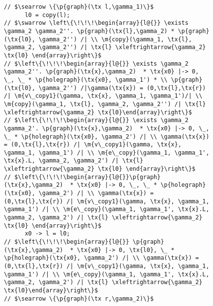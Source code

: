 \begin{figure}
\begin{lstlisting}
// $\searrow \{\p{graph}(\tx l,\gamma_1)\}$
      l0 = copy(l);
// $\swarrow \left\{\!\!\!\begin{array}{l@{}} \exists \gamma_2 \gamma_2''. \p{graph}(\tx{l},\gamma_2) * \p{graph}(\tx{l0}, \gamma_2'') /| \\ \m{copy}(\gamma_1, \tx{l}, \gamma_2, \gamma_2'') /| \tx{l} \xleftrightarrow{\gamma_2} \tx{l0} \end{array}\right\}$
// $\left\{\!\!\!\begin{array}{l@{}} \exists \gamma_2 \gamma_2''. \p{graph}(\tx{x},\gamma_2)  * \tx{x0} |-> 0, \_, \_ * \p{holegraph}(\tx{x0}, \gamma_1') * \\ \p{graph}(\tx{l0}, \gamma_2'') /|\gamma(\tx{x}) = (0,\tx{l},\tx{r}) /| \m{v\_copy1}(\gamma, \tx{x}, \gamma_1, \gamma_1')/| \\ \m{copy}(\gamma_1, \tx{l}, \gamma_2, \gamma_2'') /| \tx{l} \xleftrightarrow{\gamma_2} \tx{l0}\end{array}\right\}$
// $\left\{\!\!\!\begin{array}{l@{}} \exists \gamma_2 \gamma_2'. \p{graph}(\tx{x},\gamma_2)  * \tx{x0} |-> 0, \_, \_ * \p{holegraph}(\tx{x0}, \gamma_2') /| \\ \gamma(\tx{x}) = (0,\tx{l},\tx{r}) /| \m{v\_copy1}(\gamma, \tx{x}, \gamma_1, \gamma_1') /| \\ \m{e\_copy}(\gamma_1, \gamma_1', \tx{x}.L, \gamma_2, \gamma_2') /| \tx{l} \xleftrightarrow{\gamma_2} \tx{l0} \end{array}\right\}$
// $\left\{\!\!\!\begin{array}{l@{}}\p{graph}(\tx{x},\gamma_2)  * \tx{x0} |-> 0, \_, \_ * \p{holegraph}(\tx{x0}, \gamma_2') /| \\ \gamma(\tx{x}) = (0,\tx{l},\tx{r}) /| \m{v\_copy1}(\gamma, \tx{x}, \gamma_1, \gamma_1') /| \\ \m{e\_copy}(\gamma_1, \gamma_1', \tx{x}.L, \gamma_2, \gamma_2') /| \tx{l} \xleftrightarrow{\gamma_2} \tx{l0} \end{array}\right\}$
      x0 -> l = l0;
// $\left\{\!\!\!\begin{array}{l@{}} \p{graph}(\tx{x},\gamma_2)  * \tx{x0} |-> 0, \tx{l0}, \_ * \p{holegraph}(\tx{x0}, \gamma_2') /| \\ \gamma(\tx{x}) = (0,\tx{l},\tx{r}) /| \m{v\_copy1}(\gamma, \tx{x}, \gamma_1, \gamma_1') /| \\ \m{e\_copy}(\gamma_1, \gamma_1', \tx{x}.L, \gamma_2, \gamma_2') /| \tx{l} \xleftrightarrow{\gamma_2} \tx{l0}\end{array}\right\}$
// $\searrow \{\p{graph}(\tx r,\gamma_2)\}$

\end{lstlisting}
\end{figure}

